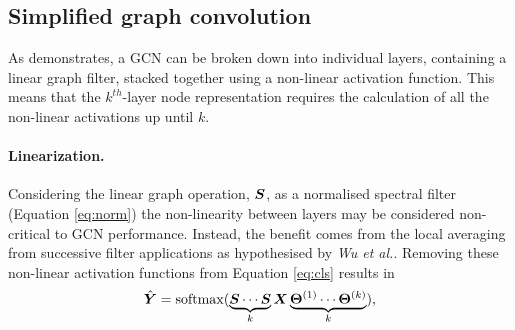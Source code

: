 %
%


\subsection{Simplified graph convolution}
\label{sec:SGC}



As  demonstrates, a GCN can be broken down into individual layers, containing a linear graph filter, stacked together using a non-linear activation function.
This means that the $k^{th}$-layer node representation requires the calculation of all the non-linear activations up until $k$.

\paragraph{Linearization.}
Considering the linear graph operation, ${\bm{S}}$, as a normalised spectral filter (Equation \ref{eq:norm}) the non-linearity between layers may be considered non-critical to GCN performance.
Instead, the benefit comes from the local averaging from successive filter applications as hypothesised by \textit{Wu et al.}.
Removing these non-linear activation functions from Equation \ref{eq:cls} results in
\begin{equation}
    \hat{{\bm{Y}}} = \operatorname{softmax}(\underbrace{{\bm{S}}\cdots{\bm{S}}}_k{\bm{X}}\underbrace{\bm{\Theta}^{(1)}\cdots\bm{\Theta}^{(k)}}_k),
\end{equation}

